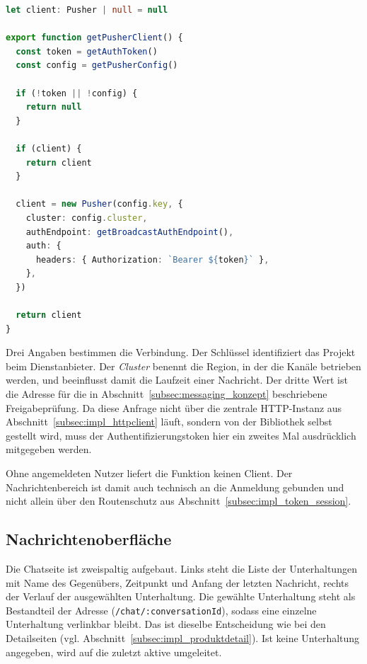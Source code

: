 \begin{lstlisting}[language=TypeScript,caption={Aufbau der Verbindung zum Echtzeitdienst (pusher-client.ts)},label={lst:pusher-client}]
let client: Pusher | null = null

export function getPusherClient() {
  const token = getAuthToken()
  const config = getPusherConfig()

  if (!token || !config) {
    return null
  }

  if (client) {
    return client
  }

  client = new Pusher(config.key, {
    cluster: config.cluster,
    authEndpoint: getBroadcastAuthEndpoint(),
    auth: {
      headers: { Authorization: `Bearer ${token}` },
    },
  })

  return client
}
\end{lstlisting}

Drei Angaben bestimmen die Verbindung. Der Schlüssel identifiziert
das Projekt beim Dienstanbieter. Der \textit{Cluster} benennt die
Region, in der die Kanäle betrieben werden, und beeinflusst damit die
Laufzeit einer Nachricht. Der dritte Wert ist die Adresse
für die in Abschnitt~\ref{subsec:messaging_konzept} beschriebene
Freigabeprüfung. Da diese Anfrage nicht über die zentrale
\acs{HTTP}-Instanz aus Abschnitt~\ref{subsec:impl_httpclient} läuft,
sondern von der Bibliothek selbst gestellt wird, muss der
Authentifizierungstoken hier ein zweites Mal ausdrücklich mitgegeben
werden.

Ohne angemeldeten Nutzer liefert die Funktion keinen Client. Der
Nachrichtenbereich ist damit auch technisch an die Anmeldung
gebunden und nicht allein über den Routenschutz aus
Abschnitt~\ref{subsec:impl_token_session}.

\subsection{Nachrichtenoberfläche}
\label{subsec:impl_chat_ui}

Die Chatseite ist zweispaltig aufgebaut. Links steht die Liste der
Unterhaltungen mit Name des Gegenübers, Zeitpunkt und Anfang der
letzten Nachricht, rechts der Verlauf der ausgewählten Unterhaltung.
Die gewählte Unterhaltung steht als Bestandteil der Adresse
(\texttt{/chat/:conversationId}), sodass eine einzelne Unterhaltung
verlinkbar bleibt. Das ist dieselbe Entscheidung wie bei den
Detailseiten (vgl. Abschnitt~\ref{subsec:impl_produktdetail}). Ist
keine Unterhaltung angegeben, wird auf die zuletzt aktive umgeleitet.

